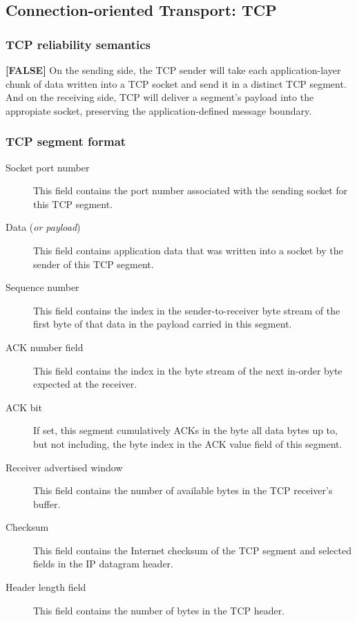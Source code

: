 \newpage
\subsection*{Connection-oriented Transport: TCP}
    \subsubsection*{TCP reliability semantics}
    \noindent \textbf{[FALSE]} On the sending side, the TCP sender will take each application-layer chunk of data written into a TCP socket and send it 
    in a distinct TCP segment. And on the receiving side, TCP will deliver a segment's payload into the appropiate socket, preserving
    the application-defined message boundary.

    \subsubsection*{TCP segment format}
    \begin{description}
        \item[Socket port number] This field contains the port number associated with the sending socket for this TCP segment.
        \item[Data (\textit{or payload})] This field contains application data that was written into a socket by the sender of this TCP segment.
        \item[Sequence number] This field contains the index in the sender-to-receiver byte stream of the first byte of that data in the payload carried in this segment.
        \item[ACK number field] This field contains the index in the byte stream of the next in-order byte expected at the receiver.
        \item[ACK bit] If set, this segment cumulatively ACKs in the byte all data bytes up to, but not including, the byte index in the ACK value field of this segment.
        \item[Receiver advertised window] This field contains the number of available bytes in the TCP receiver's buffer.
        \item[Checksum] This field contains the Internet checksum of the TCP segment and selected fields in the IP datagram header.
        \item[Header length field] This field contains the number of bytes in the TCP header.        
    \end{description}

